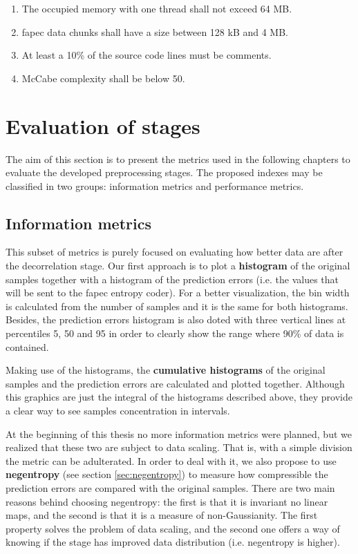 \begin{enumerate}
	\item The occupied memory with one thread shall not exceed 64 MB.
	\item \acrshort{fapec} data chunks shall have a size between 128 kB and 4 MB.
	\item At least a 10\% of the source code lines must be comments.
	\item McCabe complexity \parencite{mccabe} shall be below 50.
\end{enumerate}

\section{Evaluation of stages}
The aim of this section is to present the metrics used in the following chapters to evaluate the developed preprocessing stages. The proposed indexes may be classified in two groups: information metrics and performance metrics.

\subsection{Information metrics}
This subset of metrics is purely focused on evaluating how better data are after the decorrelation stage. Our first approach is to plot a \textbf{histogram} of the original samples together with a histogram of the prediction errors (i.e. the values that will be sent to the \acrshort{fapec} entropy coder). For a better visualization, the bin width is calculated from the number of samples and it is the same for both histograms. Besides, the prediction errors histogram is also doted with three vertical lines at percentiles 5, 50 and 95 in order to clearly show the range where 90\% of data is contained.

\begin{comment}
Figura mostrant un histograma.
\end{comment}

Making use of the histograms, the \textbf{cumulative histograms} of the original samples and the prediction errors are calculated and plotted together. Although this graphics are just the integral of the histograms described above, they provide a clear way to see samples concentration in intervals.

\begin{comment}
Figura mostrant una CDF.
\end{comment}

At the beginning of this thesis no more information metrics were planned, but we realized that these two are subject to data scaling. That is, with a simple division the metric can be adulterated. In order to deal with it, we also propose to use \textbf{negentropy} (see section \ref{sec:negentropy}) to measure how compressible the prediction errors are compared with the original samples. There are two main reasons behind choosing negentropy: the first is that it is invariant no linear maps, and the second is that it is a measure of non-Gaussianity. The first property solves the problem of data scaling, and the second one offers a way of knowing if the stage has improved data distribution (i.e. negentropy is higher).


